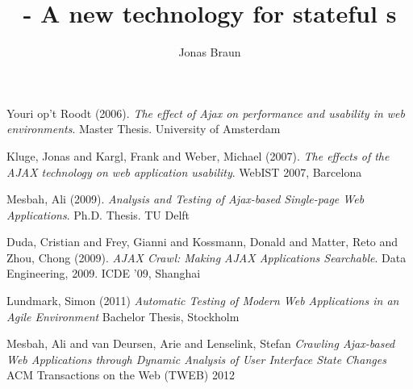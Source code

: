 \documentclass[f,bachelor,binding,twoside,palatino]{WeSTthesis}
\author{Jonas Braun}
\title{\lare{} - A new technology for stateful \singlePageApplication{}s}
\begin{document}

\maketitle
{}

\tableofcontents

\varclearpage



\newcommand\todo[1]{\textcolor{red}{#1}}



\newpage{}



\newpage{}



\newpage{}



\newpage{}



\newpage{}



\newpage{}





\begin{thebibliography}{9}

  Youri op't Roodt (2006).
  \emph{The effect of Ajax on performance and usability in web environments}.
  Master Thesis. University of Amsterdam

  Kluge, Jonas and Kargl, Frank and Weber, Michael (2007).
  \emph{The effects of the AJAX technology on web application usability}.
  WebIST 2007, Barcelona

  Mesbah, Ali (2009).
  \emph{Analysis and Testing of Ajax-based Single-page Web Applications}.
  Ph.D. Thesis. TU Delft

  Duda, Cristian and Frey, Gianni and Kossmann, Donald and Matter, Reto and Zhou, Chong (2009).
  \emph{AJAX Crawl: Making AJAX Applications Searchable}.
  Data Engineering, 2009. ICDE '09, Shanghai
  
  Lundmark, Simon (2011)
  \emph{Automatic Testing of Modern Web Applications in an Agile Environment}
  Bachelor Thesis, Stockholm

  Mesbah, Ali and van Deursen, Arie and Lenselink, Stefan
  \emph{Crawling {Ajax}-based Web Applications through Dynamic Analysis of User Interface State Changes}
  ACM Transactions on the Web (TWEB) 2012
  
\end{thebibliography}
\end{document}
